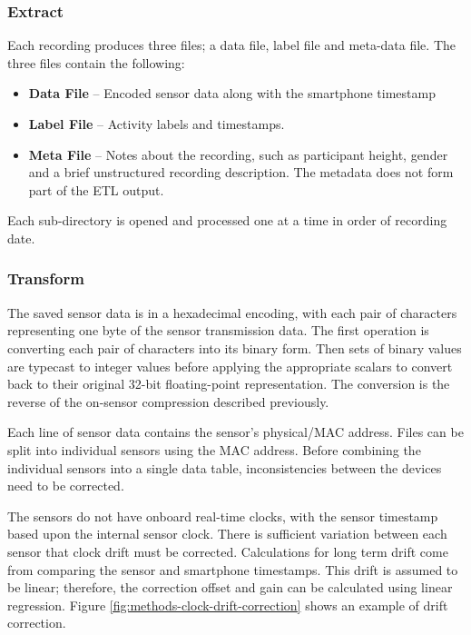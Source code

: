 \subsubsection{Extract} %
Each recording produces three files; a data file, label file and meta-data file. The three files contain the following:
\begin{itemize}
    \item \textbf{Data File} -- Encoded sensor data along with the smartphone timestamp
    \item \textbf{Label File} -- Activity labels and timestamps.
    \item \textbf{Meta File} -- Notes about the recording, such as participant height, gender and a brief unstructured recording description. The metadata does not form part of the ETL output.
\end{itemize}

Each sub-directory is opened and processed one at a time in order of recording date.

\subsubsection{Transform}
The saved sensor data is in a hexadecimal encoding, with each pair of characters representing one byte of the sensor transmission data. The first operation is converting each pair of characters into its binary form. Then sets of binary values are typecast to integer values before applying the appropriate scalars to convert back to their original 32-bit floating-point representation. The conversion is the reverse of the on-sensor compression described previously.

Each line of sensor data contains the sensor's physical/MAC address. Files can be split into individual sensors using the MAC address. Before combining the individual sensors into a single data table, inconsistencies between the devices need to be corrected.

The sensors do not have onboard real-time clocks, with the sensor timestamp based upon the internal sensor clock. There is sufficient variation between each sensor that clock drift must be corrected. Calculations for long term drift come from comparing the sensor and smartphone timestamps. This drift is assumed to be linear; therefore, the correction offset and gain can be calculated using linear regression. Figure \ref{fig:methods-clock-drift-correction} shows an example of drift correction.

